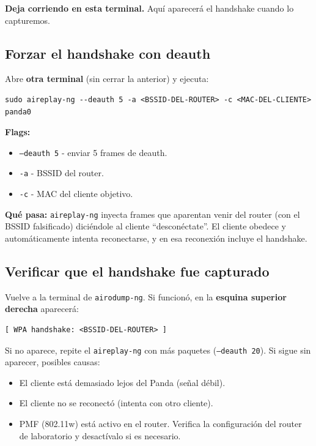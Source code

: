 \documentclass[11pt,a4paper]{article}
\begin{document}
\textbf{Deja corriendo en esta terminal.} Aquí aparecerá el handshake
cuando lo capturemos.

\subsection{Forzar el handshake con deauth}
Abre \textbf{otra terminal} (sin cerrar la anterior) y ejecuta:

\begin{lstlisting}
sudo aireplay-ng --deauth 5 -a <BSSID-DEL-ROUTER> -c <MAC-DEL-CLIENTE> panda0
\end{lstlisting}

\textbf{Flags:}

\begin{itemize}
  \item \texttt{--deauth 5} - enviar 5 frames de deauth.
  \item \texttt{-a} - BSSID del router.
  \item \texttt{-c} - MAC del cliente objetivo.
\end{itemize}

\textbf{Qué pasa:} \texttt{aireplay-ng} inyecta frames que aparentan
venir del router (con el BSSID falsificado) diciéndole al cliente
``desconéctate''. El cliente obedece y automáticamente intenta
reconectarse, y en esa reconexión incluye el handshake.

\subsection{Verificar que el handshake fue capturado}
Vuelve a la terminal de \texttt{airodump-ng}. Si funcionó, en la
\textbf{esquina superior derecha} aparecerá:

\begin{lstlisting}
[ WPA handshake: <BSSID-DEL-ROUTER> ]
\end{lstlisting}

Si no aparece, repite el \texttt{aireplay-ng} con más paquetes
(\texttt{--deauth 20}). Si sigue sin aparecer, posibles causas:

\begin{itemize}
  \item El cliente está demasiado lejos del Panda (señal débil).
  \item El cliente no se reconectó (intenta con otro cliente).
  \item PMF (802.11w) está activo en el router. Verifica la configuración
    del router de laboratorio y desactívalo si es necesario.
\end{itemize}
\end{document}
